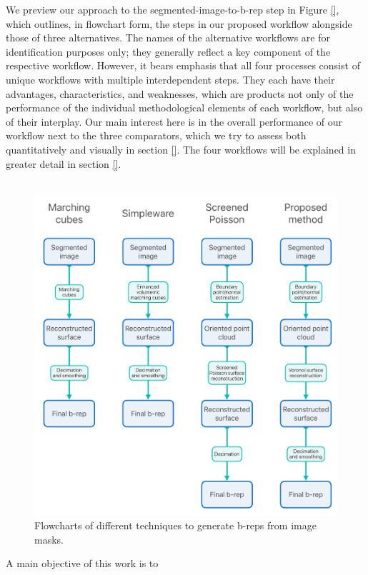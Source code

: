 %
We preview our approach to the segmented-image-to-b-rep step in Figure \ref{}, which outlines, in flowchart form, the steps in our proposed workflow alongside those of three alternatives.  The names of the alternative workflows are for identification purposes only; they generally reflect a key component of the respective workflow.  However, it bears emphasis that all four processes consist of unique workflows with multiple interdependent steps. They each have their advantages, characteristics, and weaknesses, which are products not only of the performance of the individual methodological elements of each workflow, but also of their interplay.  Our main interest here is in the overall performance of our workflow next to the three comparators, which we try to assess both quantitatively and visually in section \ref{}.  The four workflows will be explained in greater detail in section \ref{}. \\ \\
%
\begin{figure}[t]
	\centering
		\includegraphics[scale=0.3]{media/flowchartNew.pdf}
	\caption{Flowcharts of different techniques to generate b-reps from image masks.}
	\label{fig:flowchart}
\end{figure}\noindent
%
A main objective of this work is to
